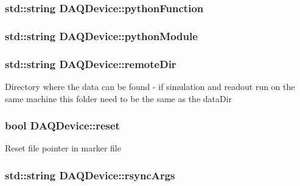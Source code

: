 \hypertarget{classDAQDevice_ac2662dfe78ec08ab4bd8cc8e159fed0f}{
\subsubsection[{python\-Function}]{\setlength{\rightskip}{0pt plus 5cm}std\-::string D\-A\-Q\-Device\-::python\-Function\hspace{0.3cm}{\ttfamily [protected]}}}\label{classDAQDevice_ac2662dfe78ec08ab4bd8cc8e159fed0f}
\hypertarget{classDAQDevice_a75b36464a8009089f1f5721764f7bf70}{
\subsubsection[{python\-Module}]{\setlength{\rightskip}{0pt plus 5cm}std\-::string D\-A\-Q\-Device\-::python\-Module\hspace{0.3cm}{\ttfamily [protected]}}}\label{classDAQDevice_a75b36464a8009089f1f5721764f7bf70}
\hypertarget{classDAQDevice_a6df191f01fd268b0072e09ba2b76827f}{
\subsubsection[{remote\-Dir}]{\setlength{\rightskip}{0pt plus 5cm}std\-::string D\-A\-Q\-Device\-::remote\-Dir\hspace{0.3cm}{\ttfamily [protected]}}}\label{classDAQDevice_a6df191f01fd268b0072e09ba2b76827f}
Directory where the data can be found -\/ if simulation and readout run on the same machine this folder need to be the same as the data\-Dir \hypertarget{classDAQDevice_ad9f21827cf4471e11b5e5bfe8f29152f}{
\subsubsection[{reset}]{\setlength{\rightskip}{0pt plus 5cm}bool D\-A\-Q\-Device\-::reset\hspace{0.3cm}{\ttfamily [protected]}}}\label{classDAQDevice_ad9f21827cf4471e11b5e5bfe8f29152f}
Reset file pointer in marker file \hypertarget{classDAQDevice_ae6db34954e8c3723feba1d32a7643095}{
\subsubsection[{rsync\-Args}]{\setlength{\rightskip}{0pt plus 5cm}std\-::string D\-A\-Q\-Device\-::rsync\-Args\hspace{0.3cm}{\ttfamily [protected]}}}\label{classDAQDevice_ae6db34954e8c3723feba1d32a7643095}
